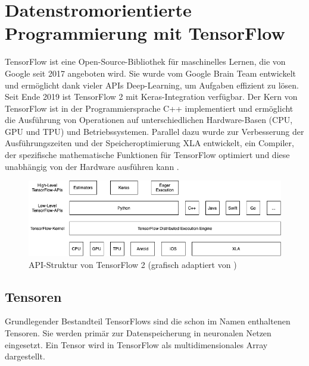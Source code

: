 \section{Datenstromorientierte Programmierung mit TensorFlow}
TensorFlow ist eine Open-Source-Bibliothek für maschinelles Lernen, die von Google seit 2017 angeboten wird. Sie wurde vom Google Brain Team entwickelt und ermöglicht dank vieler \acp{API} Deep-Learning, um Aufgaben effizient zu lösen. Seit Ende 2019 ist TensorFlow 2 mit Keras-Integration verfügbar. 
Der Kern von TensorFlow ist in der Programmiersprache C++ implementiert und ermöglicht die Ausführung von Operationen auf unterschiedlichen Hardware-Basen (\ac{CPU}, \ac{GPU} und \ac{TPU}) und Betriebssystemen.  Parallel dazu wurde zur Verbesserung der Ausführungszeiten und der Speicheroptimierung \ac{XLA} entwickelt, ein Compiler, der spezifische mathematische Funktionen für TensorFlow optimiert und diese unabhängig von der Hardware ausführen kann \cite[139\psq]{Deru2019}.
\begin{figure}[htb]
	\centering
	\includegraphics[height=.2\textwidth]{images/TF2-API-Struktur}
	\caption[TensorFlow API Struktur]{API-Struktur von TensorFlow 2 (grafisch adaptiert von \cite[140]{Deru2019}\cites{TfAPI})}
	\label{fig:tfstructure}
\end{figure}

\newpage

\subsection{Tensoren}
Grundlegender Bestandteil TensorFlows sind die schon im Namen enthaltenen Tensoren. Sie werden primär zur Datenspeicherung in neuronalen Netzen eingesetzt. Ein Tensor wird in TensorFlow als multidimensionales Array dargestellt. 

